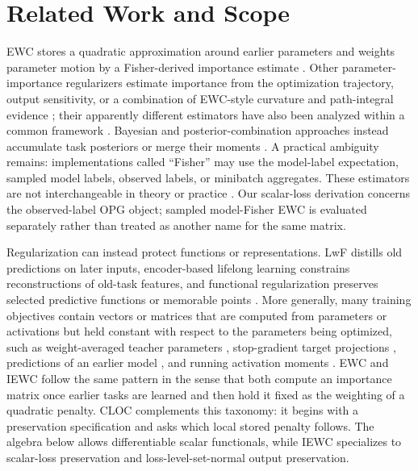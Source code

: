 \section{Related Work and Scope}
\label{sec:related-work}

EWC stores a quadratic approximation around earlier parameters and weights parameter motion by a Fisher-derived importance estimate \citep{EWC}. Other parameter-importance regularizers estimate importance from the optimization trajectory, output sensitivity, or a combination of EWC-style curvature and path-integral evidence \citep{SI,MAS,RWalk}; their apparently different estimators have also been analyzed within a common framework \citep{BenzingRegularisation}. Bayesian and posterior-combination approaches instead accumulate task posteriors or merge their moments \citep{ProgressCompress,VCL,IMM}. A practical ambiguity remains: implementations called ``Fisher'' may use the model-label expectation, sampled model labels, observed labels, or minibatch aggregates. These estimators are not interchangeable in theory or practice \citep{KunstnerEF,VanDeVenFisher2025}. Our scalar-loss derivation concerns the observed-label OPG object; sampled model-Fisher EWC is evaluated separately rather than treated as another name for the same matrix.

Regularization can instead protect functions or representations. LwF distills old predictions on later inputs, encoder-based lifelong learning constrains reconstructions of old-task features, and functional regularization preserves selected predictive functions or memorable points \citep{LwF,EBLL,FunctionalGP,FROMP}. More generally, many training objectives contain vectors or matrices that are computed from parameters or activations but held constant with respect to the parameters being optimized, such as weight-averaged teacher parameters \citep{MeanTeacher}, stop-gradient target projections \citep{BYOL,SimSiam}, predictions of an earlier model \citep{LwF}, and running activation moments \citep{TeReL}. EWC and IEWC follow the same pattern in the sense that both compute an importance matrix once earlier tasks are learned and then hold it fixed as the weighting of a quadratic penalty. CLOC complements this taxonomy: it begins with a preservation specification and asks which local stored penalty follows. The algebra below allows differentiable scalar functionals, while IEWC specializes to scalar-loss preservation and loss-level-set-normal output preservation.

